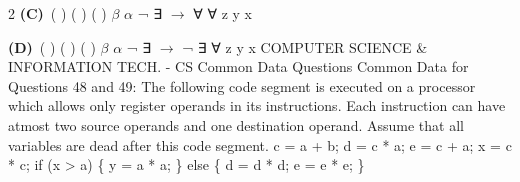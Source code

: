 \documentclass[a4paper,10pt,twoside]{article}
\begin{document}
\begin{multicols}{2}
\textbf{(C)}~( ) \newline ( \newline ) \newline ( \newline ) \newline $\beta$ \newline $\alpha$ \newline ¬ \newline ∃ \newline $\to$ \newline ∀ \newline ∀ \newline z \newline y \newline x\par\vspace{2pt}\noindent
\textbf{(D)}~( \newline ) \newline ( \newline ) \newline ( \newline ) \newline $\beta$ \newline $\alpha$ \newline ¬ \newline ∃ \newline $\to$ \newline ¬ \newline ∃ \newline ∀ \newline z \newline y \newline x  COMPUTER SCIENCE \& INFORMATION TECH. - CS \newline  \newline Common Data Questions \newline Common Data for Questions 48 and 49: \newline  \newline The following code segment is executed on a processor which allows only register operands in its \newline instructions. Each instruction can have atmost two source operands and one destination operand. Assume \newline that all variables are dead after this code segment. \newline c = a + b; \newline d = c * a; \newline e = c + a; \newline x = c * c; \newline if (x > a) \{ \newline y = a * a; \newline \} \newline else \{ \newline d = d * d; \newline e = e * e; \newline \}

\end{multicols}
\end{document}
